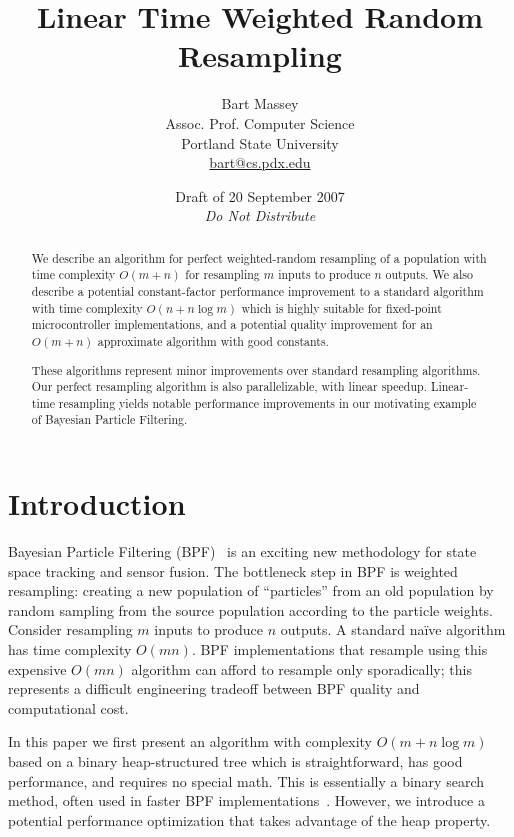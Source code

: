 \documentclass[12pt]{article}
\title{Linear Time Weighted Random Resampling}
\author{Bart Massey\\
  Assoc. Prof. Computer Science\\
  Portland State University\\
  \url{bart@cs.pdx.edu}}
\date{Draft of 20 September 2007\\{\em Do Not Distribute}}
\begin{document}
  \maketitle

  \begin{abstract}
  We describe an algorithm for perfect weighted-random
  resampling of a population with time complexity $O(m +
  n)$ for resampling $m$ inputs to produce $n$ outputs.
  We also describe a potential constant-factor performance improvement to a
  standard algorithm with time complexity
  $O(n + n \log m)$ which is highly suitable for fixed-point
  microcontroller implementations, and a potential quality
  improvement for an $O(m+n)$ approximate algorithm with
  good constants.

  These algorithms represent minor improvements over
  standard resampling algorithms.  Our perfect resampling
  algorithm is also parallelizable, with linear speedup.
  Linear-time resampling yields notable performance
  improvements in our motivating example of Bayesian
  Particle Filtering.
  \end{abstract}

\section{Introduction}

  Bayesian Particle Filtering (BPF)~\cite{bpf} is an exciting
  new methodology for state space tracking and sensor fusion.
  The bottleneck step in BPF is weighted resampling: creating
  a new population of ``particles'' from an old population by
  random sampling from the source population according to the
  particle weights.  Consider resampling $m$ inputs to produce
  $n$ outputs.  A standard na\"ive algorithm has time
  complexity $O(mn)$.  BPF implementations that resample using
  this expensive $O(mn)$ algorithm can afford to resample only
  sporadically; this represents a difficult engineering
  tradeoff between BPF quality and computational cost.

  In this paper we first present an algorithm with
  complexity $O(m + n \log m)$ based on a binary
  heap-structured tree which is straightforward, has good
  performance, and requires no special math.  This is
  essentially a binary search method, often used in faster
  BPF implementations~\cite{arulampalam02tutorial}.  However, we introduce a potential
  performance optimization that takes advantage of the heap
  property.
\end{document}
